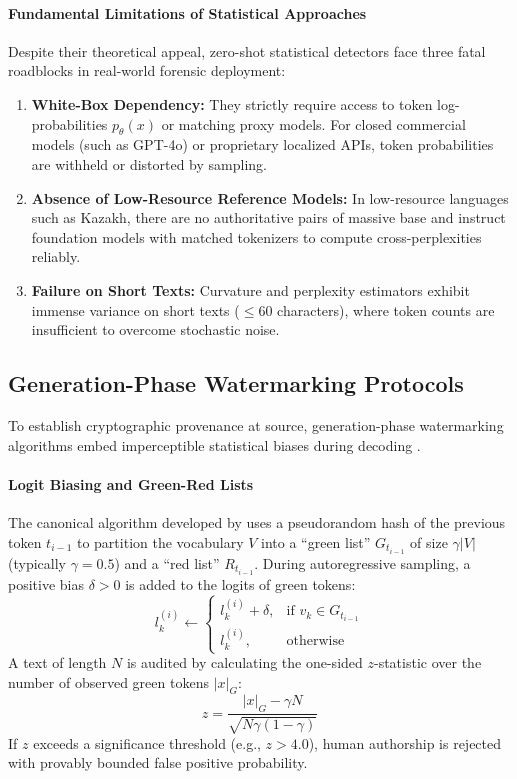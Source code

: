 \paragraph{Fundamental Limitations of Statistical Approaches}
Despite their theoretical appeal, zero-shot statistical detectors face three fatal roadblocks in real-world forensic deployment:
\begin{enumerate}
    \item \textbf{White-Box Dependency:} They strictly require access to token log-probabilities $p_\theta(x)$ or matching proxy models. For closed commercial models (such as GPT-4o) or proprietary localized APIs, token probabilities are withheld or distorted by sampling.
    \item \textbf{Absence of Low-Resource Reference Models:} In low-resource languages such as Kazakh, there are no authoritative pairs of massive base and instruct foundation models with matched tokenizers to compute cross-perplexities reliably.
    \item \textbf{Failure on Short Texts:} Curvature and perplexity estimators exhibit immense variance on short texts ($\le 60$ characters), where token counts are insufficient to overcome stochastic noise.
\end{enumerate}

\subsection{Generation-Phase Watermarking Protocols}
To establish cryptographic provenance at source, generation-phase watermarking algorithms embed imperceptible statistical biases during decoding \citep{kirchenbauer2023watermark}. 

\paragraph{Logit Biasing and Green-Red Lists}
The canonical algorithm developed by \citet{kirchenbauer2023watermark} uses a pseudorandom hash of the previous token $t_{i-1}$ to partition the vocabulary $V$ into a ``green list'' $G_{t_{i-1}}$ of size $\gamma |V|$ (typically $\gamma = 0.5$) and a ``red list'' $R_{t_{i-1}}$. During autoregressive sampling, a positive bias $\delta > 0$ is added to the logits of green tokens:
\begin{equation}
l_k^{(i)} \leftarrow \begin{cases}
l_k^{(i)} + \delta, & \text{if } v_k \in G_{t_{i-1}} \\
l_k^{(i)}, & \text{otherwise}
\end{cases}
\end{equation}
A text of length $N$ is audited by calculating the one-sided $z$-statistic over the number of observed green tokens $|x|_G$:
\begin{equation}
z = \frac{|x|_G - \gamma N}{\sqrt{N \gamma (1 - \gamma)}}
\end{equation}
If $z$ exceeds a significance threshold (e.g., $z > 4.0$), human authorship is rejected with provably bounded false positive probability.

